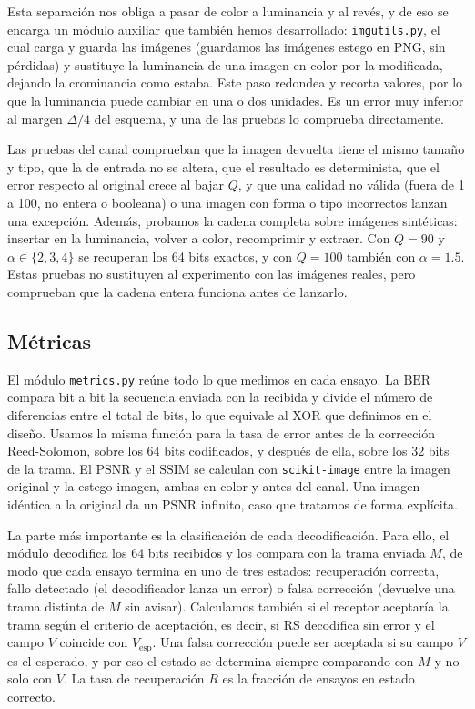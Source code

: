 \documentclass[IB]{TFUOC}%
\begin{document}
Esta separación nos obliga a pasar de color a luminancia y al revés, y de eso se encarga un módulo 
auxiliar que también hemos desarrollado: \texttt{imgutils.py}, el cual carga y guarda las imágenes (guardamos las imágenes estego en 
PNG, sin pérdidas) y sustituye la luminancia de una imagen en color por la modificada, dejando la 
crominancia como estaba. Este paso redondea y recorta valores, por lo que la luminancia puede 
cambiar en una o dos unidades. Es un error muy inferior al margen $\Delta/4$ del esquema, y una 
de las pruebas lo comprueba directamente.

Las pruebas del canal comprueban que la imagen devuelta tiene el mismo tamaño y tipo, que la de 
entrada no se altera, que el resultado es determinista, que el error respecto al original crece 
al bajar $Q$, y que una calidad no válida (fuera de 1 a 100, no entera o booleana) o una imagen 
con forma o tipo incorrectos lanzan una excepción. Además, probamos la cadena completa sobre 
imágenes sintéticas: insertar en la luminancia, volver a color, recomprimir y extraer. 
Con $Q=90$ y $\alpha \in \{2, 3, 4\}$ se recuperan los 64 bits exactos, y con $Q=100$ también 
con $\alpha=1{.}5$. Estas pruebas no sustituyen al experimento con las imágenes reales, pero 
comprueban que la cadena entera funciona antes de lanzarlo.

\subsection{Métricas}%
\label{subsec:impl_metrics}

El módulo \texttt{metrics.py} reúne todo lo que medimos en cada ensayo. La $\mathrm{BER}$ compara bit a bit 
la secuencia enviada con la recibida y divide el número de diferencias 
entre el total de bits, lo que equivale al XOR que definimos en el diseño. 
Usamos la misma función para la tasa de error antes de la corrección Reed-Solomon, sobre los 64 
bits codificados, y después de ella, sobre los 32 bits de la trama. 
El $\mathrm{PSNR}$ y el $\mathrm{SSIM}$ se calculan con \texttt{scikit-image} entre la imagen 
original y la estego-imagen, ambas en color y antes del canal. Una imagen idéntica a la original da 
un $\mathrm{PSNR}$ infinito, caso que tratamos de forma explícita.

La parte más importante es la clasificación de cada decodificación. Para ello, el módulo decodifica 
los 64 bits recibidos y los compara con la trama enviada $M$, de modo que cada ensayo termina en 
uno de tres estados: recuperación correcta, fallo detectado (el decodificador lanza un error) o 
falsa corrección (devuelve una trama distinta de $M$ sin avisar). Calculamos también si el 
receptor aceptaría la trama según el criterio de aceptación, es decir, si RS decodifica sin error y 
el campo $V$ coincide con $V_{\mathrm{esp}}$. Una falsa corrección puede ser aceptada si su 
campo $V$ es el esperado, y por eso el estado se determina siempre comparando con $M$ y no solo 
con $V$. La tasa de recuperación $R$ es la fracción de ensayos en estado correcto.
\end{document}
